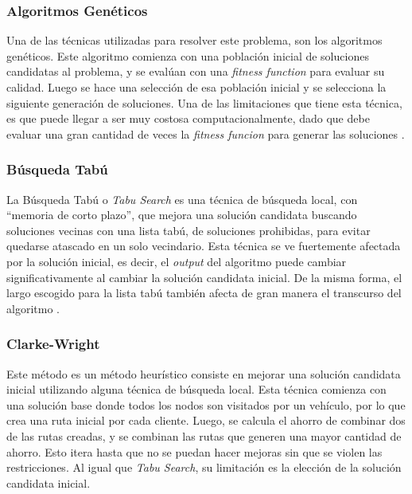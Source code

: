 \documentclass{article}
\begin{document}
\subsubsection{Algoritmos Genéticos}
Una de las técnicas utilizadas para resolver este problema, son los algoritmos genéticos. Este algoritmo comienza con una población inicial de soluciones candidatas al problema, y se evalúan con una \textit{fitness function} para evaluar su calidad. Luego se hace una selección de esa población inicial y se selecciona la siguiente generación de soluciones. Una de las limitaciones que tiene esta técnica, es que puede llegar a ser muy costosa computacionalmente, dado que debe evaluar una gran cantidad de veces la \textit{fitness funcion} para generar las soluciones \cite{ge2023genetic}. 

\subsubsection{Búsqueda Tabú}
La Búsqueda Tabú o \textit{Tabu Search} es una técnica de búsqueda local, con ``memoria de corto plazo'', que mejora una solución candidata buscando soluciones vecinas con una lista tabú, de soluciones prohibidas, para evitar quedarse atascado en un solo vecindario. Esta técnica se ve fuertemente afectada por la solución inicial, es decir, el \textit{output} del algoritmo puede cambiar significativamente al cambiar la solución candidata inicial. De la misma forma, el largo escogido para la lista tabú también afecta de gran manera el transcurso del algoritmo \cite{xu2022model}.
\subsubsection{Clarke-Wright}
Este método es un método heurístico consiste en mejorar una solución candidata inicial utilizando alguna técnica de búsqueda local. Esta técnica comienza con una solución base donde todos los nodos son visitados por un vehículo, por lo que crea una ruta inicial por cada cliente. Luego, se calcula el ahorro de combinar dos de las rutas creadas, y se combinan las rutas que generen una mayor cantidad de ahorro. Esto itera hasta que no se puedan hacer mejoras sin que se violen las restricciones. Al igual que \textit{Tabu Search}, su limitación es la elección de la solución candidata inicial\cite{talarico2015metaheuristics}\cite{talarico2017large}.
\end{document}
